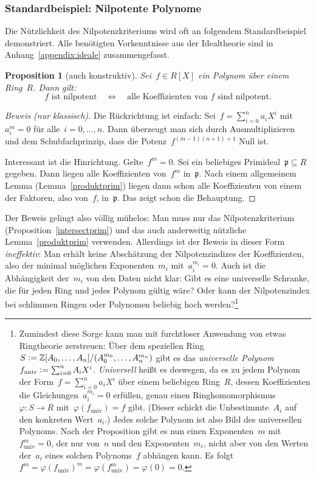 \documentclass[a4paper,ngerman,12pt]{scrartcl}
\theoremstyle{definition}
\theoremstyle{plain}
\newtheorem{prop}[defn]{Proposition}
\theoremstyle{remark}
\newcommand{\ZZ}{\mathbb{Z}}
\newcommand{\pp}{\mathfrak{p}}
\renewcommand{\_}{\mathpunct{.}\,}
\newcommand{\?}{\,{:}\,}
\newcommand{\defeq}{\vcentcolon=}
\begin{document}
\subsubsection*{Standardbeispiel: Nilpotente Polynome}
\label{bsp:nilpotentepolynome}

Die Nützlichkeit des Nilpotenzkriteriums wird oft an folgendem Standardbeispiel
demonstriert. Alle benötigten Vorkenntnisse aus der Idealtheorie sind in
Anhang~\ref{appendix:ideale} zusammengefasst.

\begin{prop}[auch konstruktiv]Sei~$f \in R[X]$ ein Polynom über einem Ring~$R$. Dann gilt:
\[ \text{$f$ ist nilpotent} \quad\Longleftrightarrow\quad
  \text{alle Koeffizienten von~$f$ sind nilpotent}. \]
\end{prop}
\begin{proof}[Beweis (nur klassisch)]Die Rückrichtung ist einfach: Sei~$f = \sum_{i=0}^n a_i X^i$
mit~$a_i^m = 0$ für alle~$i = 0,\ldots,n$. Dann überzeugt man sich durch
Ausmultiplizieren und dem Schubfachprinzip, dass die Potenz~$f^{(m-1)(n+1) +
1}$ Null ist.

Interessant ist die Hinrichtung. Gelte~$f^m = 0$. Sei ein beliebiges
Primideal~$\pp \subseteq R$ gegeben. Dann liegen alle Koeffizienten von~$f^m$
in~$\pp$. Nach einem allgemeinem Lemma (Lemma~\ref{produktprim}) liegen dann
schon alle Koeffizienten von einem der Faktoren, also von~$f$, in~$\pp$. Das
zeigt schon die Behauptung.
\end{proof}

Der Beweis gelingt also völlig mühelos: Man muss nur
das Nilpotenzkriterium (Proposition~\ref{intersectprim}) und das auch anderweitig nützliche
Lemma~\ref{produktprim} verwenden. Allerdings ist der Beweis in dieser Form
\emph{ineffektiv}: Man erhält keine Abschätzung der Nilpotenzindizes der
Koeffizienten, also der minimal möglichen Exponenten~$m_i$ mit~$a_i^{m_i} = 0$.
Auch ist die Abhängigkeit der~$m_i$ von den Daten nicht klar: Gibt es eine
universelle Schranke, die für jeden Ring und jedes Polynom gültig wäre? Oder
kann der Nilpotenzindex bei schlimmen Ringen oder Polynomen beliebig hoch
werden?\footnote{Zumindest diese Sorge kann man mit furchtloser Anwendung von
etwas Ringtheorie zerstreuen: Über dem speziellen Ring~$S \defeq
\ZZ[A_0,\ldots,A_n]/(A_0^{m_0},\ldots,A_n^{m_n})$ gibt es das \emph{universelle
Polynom} $f_\text{univ} \defeq \sum_{i=0}^n A_i X^i$. \emph{Universell} heißt es
deswegen, da es zu jedem Polynom der Form~$f = \sum_{i=0}^n a_i X^i$ über einem
beliebigen Ring~$R$, dessen Koeffizienten die Gleichungen~$a_i^{m_i} = 0$
erfüllen, genau einen Ringhomomorphismus~$\varphi : S \to R$
mit~$\varphi(f_\text{univ}) = f$ gibt. (Dieser schickt die Unbestimmte~$A_i$
auf den konkreten Wert~$a_i$.) Jedes solche Polynom ist also Bild des
universellen Polynoms. Nach der Proposition gibt es nun einen
Exponenten~$m$ mit~$f_\text{univ}^m = 0$, der nur von~$n$ und den
Exponenten~$m_i$, nicht aber von den Werten der~$a_i$ eines solchen
Polynoms~$f$ abhängen kann. Es folgt~$f^m = \varphi(f_\text{univ})^m =
\varphi(f_\text{univ}^m) = \varphi(0) = 0$.}
\end{document}
